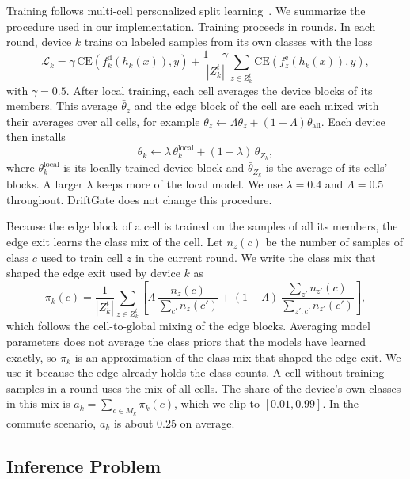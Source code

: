 Training follows multi-cell personalized split learning~\cite{han2023splitgp,rizwan2026splitomc}. We summarize the procedure used in our implementation. Training proceeds in rounds. In each round, device $k$ trains on labeled samples from its own classes with the loss
\begin{equation}
\mathcal{L}_k=\gamma\,\mathrm{CE}\!\left(f_k^{\mathrm{d}}(h_k(x)),y\right)+\frac{1-\gamma}{|Z_k^t|}\sum_{z\in Z_k^t}\mathrm{CE}\!\left(f_z^{\mathrm{e}}(h_k(x)),y\right),
\label{eq:loss}
\end{equation}
with $\gamma=0.5$. After local training, each cell averages the device blocks of its members. This average $\bar\theta_z$ and the edge block of the cell are each mixed with their averages over all cells, for example $\bar\theta_z\leftarrow\Lambda\bar\theta_z+(1-\Lambda)\bar\theta_{\mathrm{all}}$. Each device then installs
\begin{equation}
\theta_k\leftarrow\lambda\,\theta_k^{\mathrm{local}}+(1-\lambda)\,\bar\theta_{Z_k},
\label{eq:lambda}
\end{equation}
where $\theta_k^{\mathrm{local}}$ is its locally trained device block and $\bar\theta_{Z_k}$ is the average of its cells' blocks. A larger $\lambda$ keeps more of the local model. We use $\lambda=0.4$ and $\Lambda=0.5$ throughout. DriftGate does not change this procedure.

Because the edge block of a cell is trained on the samples of all its members, the edge exit learns the class mix of the cell. Let $n_z(c)$ be the number of samples of class $c$ used to train cell $z$ in the current round. We write the class mix that shaped the edge exit used by device $k$ as
\begin{equation}
\pi_k(c)=\frac{1}{|Z_k^t|}\sum_{z\in Z_k^t}\left[\Lambda\,\frac{n_z(c)}{\sum_{c'}n_z(c')}+(1-\Lambda)\,\frac{\sum_{z'}n_{z'}(c)}{\sum_{z',c'}n_{z'}(c')}\right],
\label{eq:pi}
\end{equation}
which follows the cell-to-global mixing of the edge blocks. Averaging model parameters does not average the class priors that the models have learned exactly, so $\pi_k$ is an approximation of the class mix that shaped the edge exit. We use it because the edge already holds the class counts. A cell without training samples in a round uses the mix of all cells. The share of the device's own classes in this mix is $a_k=\sum_{c\in M_k}\pi_k(c)$, which we clip to $[0.01,0.99]$. In the commute scenario, $a_k$ is about 0.25 on average.

\subsection{Inference Problem}

